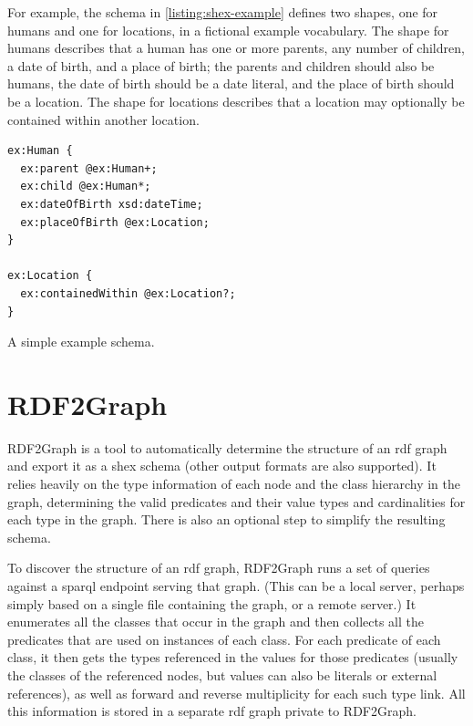 For example, the schema in \cref{listing:shex-example} defines two \glspl{shape},
one for humans and one for locations,
in a fictional example vocabulary.
The \gls{shape} for humans describes that a human has one or more parents,
any number of children,
a date of birth,
and a place of birth;
the parents and children should also be humans,
the date of birth should be a date literal,
and the place of birth should be a location.
The \gls{shape} for locations describes that a location may optionally be contained within another location.

\begin{lstfloat}
\begin{lstlisting}[language=sparql]
ex:Human {
  ex:parent @ex:Human+;
  ex:child @ex:Human*;
  ex:dateOfBirth xsd:dateTime;
  ex:placeOfBirth @ex:Location;
}

ex:Location {
  ex:containedWithin @ex:Location?;
}
\end{lstlisting}
\caption{A simple example \gls{schema}.}
\label{listing:shex-example}
\end{lstfloat}


\section{RDF2Graph}
\label{sec:Background:RDF2Graph}


\gls{RDF2Graph} \cite{vanDam2015}
is a tool to automatically determine the structure of an \gls{rdf} graph
and export it as a \gls{shex} \gls{schema}
(other output formats are also supported).
It relies heavily on the type information of each node and the class hierarchy in the graph,
determining the valid \glspl{predicate} and their value types and cardinalities for each type in the graph.
There is also an optional step to simplify the resulting \gls{schema}.

To discover the structure of an \gls{rdf} graph,
\gls{RDF2Graph} runs a set of queries against a \gls{sparql} endpoint serving that graph.
(This can be a local server, perhaps simply based on a single file containing the graph,
or a remote server.)
It enumerates all the classes that occur in the graph
and then collects all the \glspl{predicate} that are used on instances of each class.
For each \gls{predicate} of each class,
it then gets the types referenced in the values for those \glspl{predicate}
(usually the classes of the referenced nodes,
but values can also be literals or external references),
as well as forward and reverse multiplicity for each such type link.
All this information is stored in a separate \gls{rdf} graph private to \gls{RDF2Graph}.

